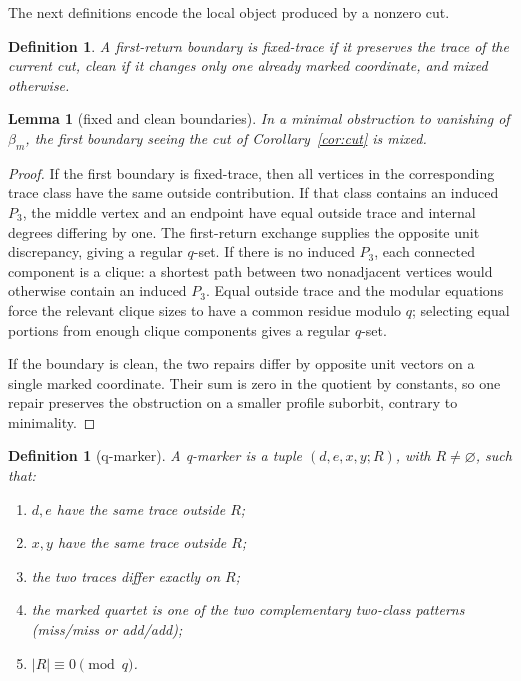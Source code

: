 \documentclass[11pt]{article}
\newtheorem{lemma}[theorem]{Lemma}
\newtheorem{definition}[theorem]{Definition}
\theoremstyle{remark}
\begin{document}
The next definitions encode the local object produced by a nonzero cut.

\begin{definition}
A first-return boundary is fixed-trace if it preserves the trace of the current
cut, clean if it changes only one already marked coordinate, and mixed
otherwise.
\end{definition}

\begin{lemma}[fixed and clean boundaries]\label{lem:fixed-clean}
In a minimal obstruction to vanishing of \(\beta_m\), the first boundary seeing
the cut of Corollary~\ref{cor:cut} is mixed.
\end{lemma}

\begin{proof}
If the first boundary is fixed-trace, then all vertices in the corresponding
trace class have the same outside contribution.  If that class contains an
induced \(P_3\), the middle vertex and an endpoint have equal outside trace and
internal degrees differing by one.  The first-return exchange supplies the
opposite unit discrepancy, giving a regular \(q\)-set.  If there is no induced
\(P_3\), each connected component is a clique: a shortest path between two
nonadjacent vertices would otherwise contain an induced \(P_3\).  Equal outside
trace and the modular equations force the relevant clique sizes to have a common
residue modulo \(q\); selecting equal portions from enough clique components
gives a regular \(q\)-set.

If the boundary is clean, the two repairs differ by opposite unit vectors on a
single marked coordinate.  Their sum is zero in the quotient by constants, so
one repair preserves the obstruction on a smaller profile suborbit, contrary to
minimality.
\end{proof}

\begin{definition}[q-marker]
A q-marker is a tuple \((d,e,x,y;R)\), with \(R\ne\varnothing\), such that:
\begin{enumerate}[label=(\roman*)]
\item \(d,e\) have the same trace outside \(R\);
\item \(x,y\) have the same trace outside \(R\);
\item the two traces differ exactly on \(R\);
\item the marked quartet is one of the two complementary two-class patterns
      (miss/miss or add/add);
\item \(|R|\equiv0\pmod q\).
\end{enumerate}
\end{definition}
\end{document}
